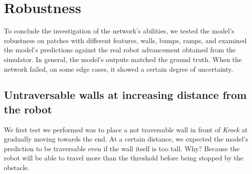 \documentclass[../document.tex]{subfiles}
\begin{document}
\section{Robustness}
\label{sec: robustness}
To conclude the investigation of the network's abilities, we tested the model's robustness on patches with different features, walls, bumps, ramps, and examined the model's predictions against the real robot advancement obtained from the simulator. In general, the model's outputs matched the ground truth. When the network failed, on some edge cases, it showed a certain degree of uncertainty.
\subsection{Untraversable walls at increasing distance from the robot}
We first test we performed was to place a not traversable wall in front of \emph{Krock} at gradually moving towards the end. At a certain distance, we expected the model's prediction to be traversable even if the wall itself is too tall. Why? Because the robot will be able to travel more than the threshold before being stopped by the obstacle.
\end{document}
